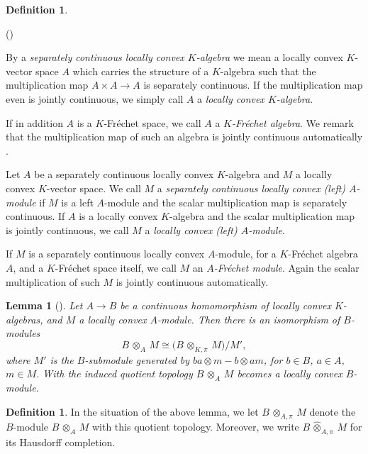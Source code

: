 \documentclass[a4paper, reqno, 10pt]{amsart}
\newtheorem{lemma}[theorem]{Lemma}
\theoremstyle{definition}
\newtheorem{definition}[theorem]{Definition}
\newenvironment{altenumerate}
	{\begin{list}
		{\textup{(\theenumi)} }
		{\usecounter{enumi}
			\setlength{\labelwidth}{0pt}
			\setlength{\labelsep}{0pt}
			\setlength{\leftmargin}{0pt}
			\setlength{\itemsep}{0pt}
			\setlength{\topsep}{0pt}
		\renewcommand{\theenumi}{\roman{enumi}}
		}}
	{\end{list}}
\numberwithin{equation}{section}
\newcommand{\botimes}[1]{{\,\otimes_{#1}\,}}
\newcommand{\cotimes}[1]{{\,\widehat{\otimes}_{#1}\,}}
\newcommand{\projotimes}{{\,\otimes_{K,\pi}\,}}
\newcommand{\ra}{\rightarrow}
\begin{document}
\begin{definition}\label{Def 1 - Topological algebras and modules}
	\begin{altenumerate}
		\item
		By a \textit{separately continuous locally convex $K$-algebra} we mean a locally convex $K$-vector space $A$ which carries the structure of a $K$-algebra such that the multiplication map $A\times A \ra A$ is separately continuous.
		If the multiplication map even is jointly continuous, we simply call $A$ a \textit{locally convex $K$-algebra}.	
		
		If in addition $A$ is a $K$-Fr\'echet space, we call $A$ a \textit{$K$-Fr\'echet algebra}.
		We remark that the multiplication map of such an algebra is jointly continuous automatically \cite[III.\ \S 5.2 Cor.\ 1]{Bourbaki87TopVectSp1to5}.
		\item
		Let $A$ be a separately continuous locally convex $K$-algebra and $M$ a locally convex $K$-vector space.
		We call $M$ a \textit{separately continuous locally convex (left) $A$-module} if $M$ is a left $A$-module and the scalar multiplication map is separately continuous.
		If $A$ is a locally convex $K$-algebra and the scalar multiplication map is jointly continuous, we call $M$ a \textit{locally convex (left) $A$-module}.
		
		If $M$ is a separately continuous locally convex $A$-module, for a $K$-Fr\'echet algebra $A$, and a $K$-Fr\'echet space itself, we call $M$ an \textit{$A$-Fr\'echet module}.
		Again the scalar multiplication of such $M$ is jointly continuous automatically.
	\end{altenumerate}
\end{definition}


\begin{lemma}[{\cite[Lemma 1.2.3]{Emerton17LocAnVect}}]\label{DefProp 1 - Projective tensor product over algebras}
	Let $A \ra B$ be a continuous homomorphism of locally convex $K$-algebras, and $M$ a locally convex $A$-module.
	Then there is an isomorphism of  $B$-modules
	\begin{equation*}
		B \botimes{A} M \cong \big( B \projotimes M \big) \big/ M' ,
	\end{equation*}
	where $M'$ is the $B$-submodule generated by $ba \otimes m - b \otimes a m$, for $b\in B$, $a\in A$, $m\in M$.
	With the induced quotient topology $B \botimes{A} M$ becomes a locally convex $B$-module.
\end{lemma}


\begin{definition}\label{Def 1 - Completed projective tensor product over algebra}
	In the situation of the above lemma, we let $B \botimes{A,\pi} M$ denote the $B$-module $B \botimes{A} M$ with this quotient topology.
	Moreover, we write $B \cotimes{A,\pi} M$ for its Hausdorff completion.
\end{definition}
\end{document}
